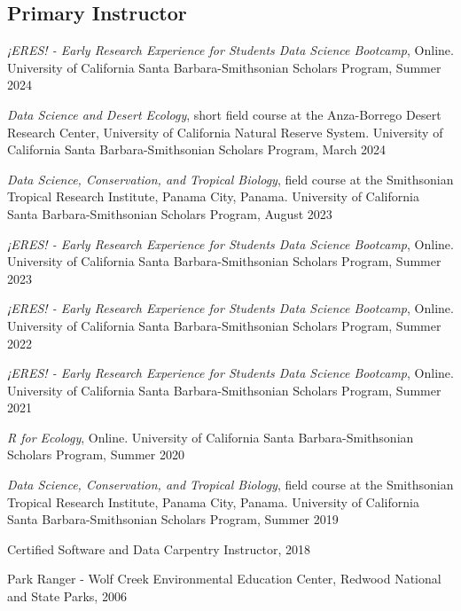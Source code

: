 \documentclass[letterpaper]{article}
\newenvironment{biblist}{%
   \begin{list}{}{%
     \setlength{\labelwidth}{0pt}%
     \setlength{\labelsep}{1em}%
     \setlength{\leftmargin}{2em}%
     \setlength{\itemindent}{-1em}%
   }
}{\end{list}}
\begin{document}
\subsection*{Primary Instructor}
\begin{biblist}
\item \emph{¡ERES! - Early Research Experience for Students Data Science Bootcamp}, Online. University of California Santa Barbara-Smithsonian Scholars Program, Summer 2024
\item \emph{Data Science and Desert Ecology}, short field course at the Anza-Borrego Desert Research Center, University of California Natural Reserve System. University of California Santa Barbara-Smithsonian Scholars Program, March 2024
\item \emph{Data Science, Conservation, and Tropical Biology}, field course at the Smithsonian Tropical Research Institute, Panama City, Panama. University of California Santa Barbara-Smithsonian Scholars Program, August 2023 
\item \emph{¡ERES! - Early Research Experience for Students Data Science Bootcamp}, Online. University of California Santa Barbara-Smithsonian Scholars Program, Summer 2023
\item \emph{¡ERES! - Early Research Experience for Students Data Science Bootcamp}, Online. University of California Santa Barbara-Smithsonian Scholars Program, Summer 2022
\item \emph{¡ERES! - Early Research Experience for Students Data Science Bootcamp}, Online. University of California Santa Barbara-Smithsonian Scholars Program, Summer 2021
\item \emph{R for Ecology}, Online. University of California Santa Barbara-Smithsonian Scholars Program, Summer 2020
\item \emph{Data Science, Conservation, and Tropical Biology}, field course at the Smithsonian Tropical Research Institute, Panama City, Panama. University of California Santa Barbara-Smithsonian Scholars Program, Summer 2019 
\item Certified Software and Data Carpentry Instructor, 2018
\item Park Ranger - Wolf Creek Environmental Education Center, Redwood National and State Parks, 2006
\end{biblist}
\end{document}
